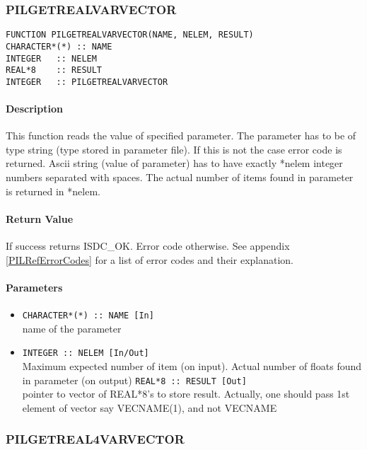 \subsubsection{PILGETREALVARVECTOR}

\begin{verbatim}
FUNCTION PILGETREALVARVECTOR(NAME, NELEM, RESULT) 
CHARACTER*(*) :: NAME 
INTEGER   :: NELEM
REAL*8    :: RESULT 
INTEGER   :: PILGETREALVARVECTOR
\end{verbatim}

\paragraph{Description\\}
This function reads the value of specified parameter. The parameter has
to be of type string (type stored in parameter file). If this is not the
case error code is returned. Ascii string (value of parameter) has to have
exactly *nelem integer numbers separated with spaces. The actual number
of items found in parameter is returned in *nelem.

\paragraph{Return Value\\}
If success returns ISDC\_OK. Error code otherwise. See appendix \ref{PILRefErrorCodes}
for a list of error codes and their explanation.

\paragraph{Parameters}
\begin{itemize}
\item
{\tt CHARACTER*(*) :: NAME [In] } \\
name of the parameter 
\item
{\tt INTEGER   :: NELEM [In/Out] } \\
Maximum expected number of item (on input). Actual number of floats found in
parameter (on output)
{\tt REAL*8 :: RESULT [Out] } \\
pointer to vector of REAL*8's to store result. Actually, one should
pass 1st element of vector say VECNAME(1), and not VECNAME
\end{itemize}



\subsubsection{PILGETREAL4VARVECTOR}

